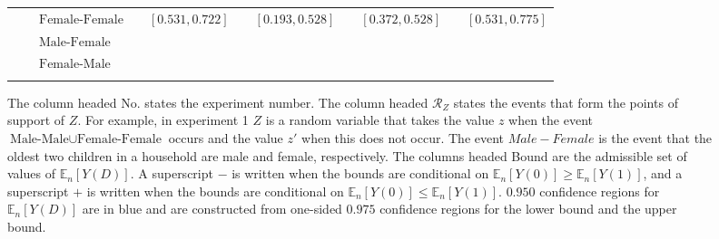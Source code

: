 \documentclass[10pt,a4paper,twoside]{article}
\numberwithin{equation}{section}
\begin{document}
\begin{sidewaystable}[p]
\begin{subfigure}{\textwidth}
\begin{tabular}{lclcrcrcrcr}
\\
& &$\text{Female-Female}$& &\color{blue}$[0.531,0.722]$	&	&	\color{blue}$[0.193,0.528]$	&	&	\color{blue}$[0.372,0.528]$	&	&	\color{blue}$[0.531,0.775]$\\
& &$\text{Male-Female}$ \\
& &$\text{Female-Male}$\\	
	\\
\bottomrule
\end{tabular}
\vspace{10pt}
\caption{The column headed No. states the experiment number. The column headed $\mathcal{R}_Z$ states the events that form the points of support of $Z$. For example, in experiment 1 $Z$ is a random variable that takes the value $z$ when the event $\text{Male-Male}\cup\text{Female-Female}$ occurs and the value $z'$ when this does not occur. The event $Male-Female$ is the event that the oldest two children in a household are male and female, respectively. The columns headed Bound are the admissible set of values of $\mathbb{E}_n[Y(D)]$. A superscript $-$ is written when the bounds are conditional on $\mathbb{E}_n[Y(0)]\geq\mathbb{E}_n[Y(1)]$, and a superscript $+$ is written when the bounds are conditional on $\mathbb{E}_n[Y(0)]\leq\mathbb{E}_n[Y(1)]$. $0.950$ confidence regions for $\mathbb{E}_n[Y(D)]$ are in blue and are constructed from one-sided $0.975$ confidence regions for the lower bound and the upper bound.}
\end{subfigure}
\label{tbl:setssame}
\end{sidewaystable}
\end{document}

